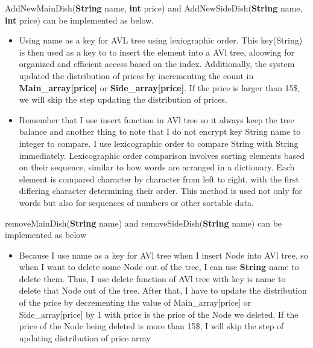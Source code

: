 \documentclass{article}
\begin{document}
	AddNewMainDish(\textbf{String} name, \textbf{int} price) and AddNewSideDish(\textbf{String} name, \textbf{int} price) can be implemented as below.
	\begin{itemize}
		\item Using name as a key for AVL tree using lexiographic order. This key(String) is then used as a key to to insert the element into a AVl tree, aloowing for organized and efficient access based on the index. Additionally, the system updated the distribution of prices by incrementing the count in \textbf{Main\_array[price]} or \textbf{Side\_array[price]}. If the price is larger than 15\$, we will skip the step updating the distribution of prices.
		\item Remember that I use insert function in AVl tree so it always keep the tree balance and another thing to note that I do not encrypt key String name to integer to compare. I use lexicographic order to compare String with String immediately. Lexicographic order comparison involves sorting elements based on their sequence, similar to how words are arranged in a dictionary. Each element is compared character by character from left to right, with the first differing character determining their order. This method is used not only for words but also for sequences of numbers or other sortable data.
	\end{itemize}
	removeMainDish(\textbf{String} name) and removeSideDish(\textbf{String} name) can be implemented as below
	\begin{itemize}
		\item Because I use name as a key for AVl tree when I insert Node into AVl tree, so when I want to delete some Node out of the tree, I can use \textbf{String} name to delete them. Thus, I use delete function of AVl tree with key is name to delete that Node out of the tree. After that, I have to update the distribution of the price by decrementing the value of Main\_array[price] or Side\_array[price] by 1 with price is the price of the Node we deleted. If the price of the Node being deleted is more than 15\$, I will skip the step of updating distribution of price array
	\end{itemize}
\end{document}
